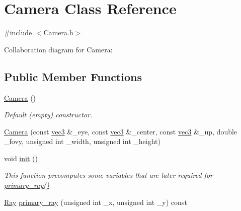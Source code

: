 \hypertarget{classCamera}{}\section{Camera Class Reference}
\label{classCamera}


{\ttfamily \#include $<$Camera.\+h$>$}



Collaboration diagram for Camera\+:
\subsection*{Public Member Functions}
\begin{DoxyCompactItemize}
\item 
\hyperlink{classCamera_a01f94c3543f56ede7af49dc778f19331}{Camera} ()
\begin{DoxyCompactList}\small\item\em Default (empty) constructor. \end{DoxyCompactList}\item 
\hyperlink{classCamera_ab1d4ceca18bb3143f89b19c2de5bccc4}{Camera} (const \hyperlink{classvec3}{vec3} \&\+\_\+eye, const \hyperlink{classvec3}{vec3} \&\+\_\+center, const \hyperlink{classvec3}{vec3} \&\+\_\+up, double \+\_\+fovy, unsigned int \+\_\+width, unsigned int \+\_\+height)
\item 
void \hyperlink{classCamera_af930ce1f46c9f5af3bd5e5bbff6b5022}{init} ()
\begin{DoxyCompactList}\small\item\em This function precomputes some variables that are later required for \hyperlink{classCamera_abc4c25528b318dabadc65e83a4052534}{primary\+\_\+ray()} \end{DoxyCompactList}\item 
\hyperlink{classRay}{Ray} \hyperlink{classCamera_abc4c25528b318dabadc65e83a4052534}{primary\+\_\+ray} (unsigned int \+\_\+x, unsigned int \+\_\+y) const 
\end{DoxyCompactItemize}
